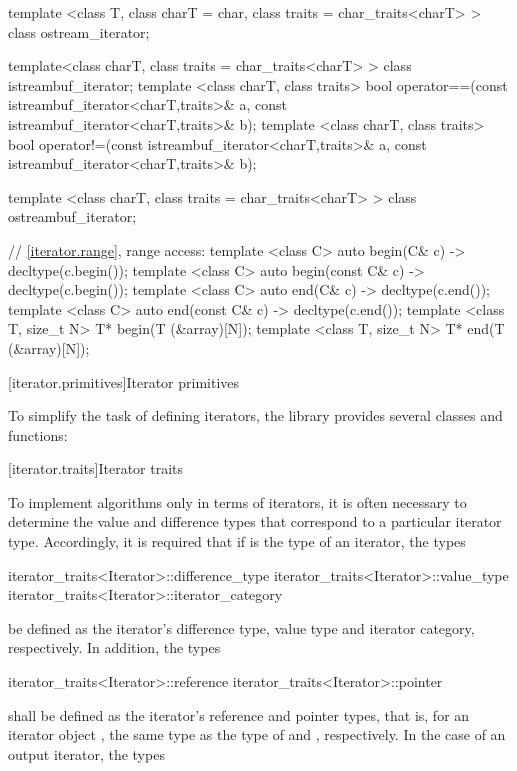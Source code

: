 \begin{codeblock}
{  template <class T, class charT = char, class traits = char_traits<charT> >
      class ostream_iterator;

  template<class charT, class traits = char_traits<charT> >
    class istreambuf_iterator;
  template <class charT, class traits>
    bool operator==(const istreambuf_iterator<charT,traits>& a,
            const istreambuf_iterator<charT,traits>& b);
  template <class charT, class traits>
    bool operator!=(const istreambuf_iterator<charT,traits>& a,
            const istreambuf_iterator<charT,traits>& b);

  template <class charT, class traits = char_traits<charT> >
    class ostreambuf_iterator;

  // \ref{iterator.range}, range access:
  template <class C> auto begin(C& c) -> decltype(c.begin());
  template <class C> auto begin(const C& c) -> decltype(c.begin());
  template <class C> auto end(C& c) -> decltype(c.end());
  template <class C> auto end(const C& c) -> decltype(c.end());
  template <class T, size_t N> T* begin(T (&array)[N]);
  template <class T, size_t N> T* end(T (&array)[N]);
}
\end{codeblock}

[iterator.primitives]{Iterator primitives}

\pnum
To simplify the task of defining iterators, the library provides
several classes and functions:

[iterator.traits]{Iterator traits}

\pnum
To implement algorithms only in terms of iterators, it is often necessary to
determine the value and
difference types that correspond to a particular iterator type.
Accordingly, it is required that if
is the type of an iterator,
the types

\begin{codeblock}
iterator_traits<Iterator>::difference_type
iterator_traits<Iterator>::value_type
iterator_traits<Iterator>::iterator_category
\end{codeblock}

be defined as the iterator's difference type, value type and iterator category, respectively.
In addition, the types

\begin{codeblock}
iterator_traits<Iterator>::reference
iterator_traits<Iterator>::pointer
\end{codeblock}

shall be defined as the iterator's reference and pointer types, that is, for an
iterator object , the same type as the type of  and ,
respectively. In the case of an output iterator, the types

